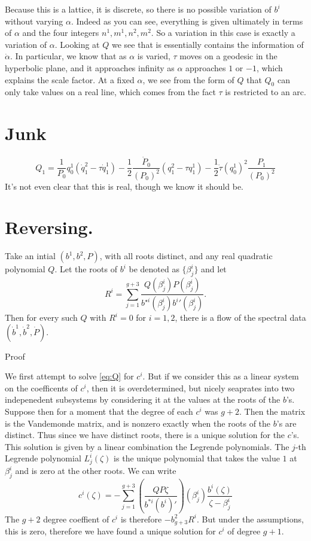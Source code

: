 \documentclass{article}
\begin{document}
Because this is a lattice, it is discrete, so there is no possible variation of $b^i$ without varying $\alpha$. Indeed as you can see, everything is given ultimately in terms of $\alpha$ and the four integers $n^1,m^1,n^2,m^2$. So a variation in this case is exactly a variation of $\alpha$. Looking at $Q$ we see that is essentially contains the information of $\dot\alpha$. In particular, we know that as $\alpha$ is varied, $\tau$ moves on a geodesic in the hyperbolic plane, and it approaches infinity as $\alpha$ approaches $1$ or $-1$, which explains the scale factor. At a fixed $\alpha$, we see from the form of $Q$ that $Q_0$ can only take values on a real line, which comes from the fact $\tau$ is restricted to an arc.

\chapter{Junk} %
\label{chp:junk}
\[
Q_1 = \frac{1}{P_0}q^1_0(\dot q^2_1 - \tau \dot q^1_1)
-\frac{1}{2}\frac{\dot P_0}{(P_0)^2}(q^2_1 - \tau q^1_1)
-\frac{1}{2}\dot\tau(q^1_0)^2\frac{P_1}{(P_0)^2}
\]
It's not even clear that this is real, though we know it should be.

\chapter{Reversing.}
Take an intial $(b^1,b^2,P)$, with all roots distinct, and any real quadratic polynomial $Q$. Let the roots of $b^i$ be denoted as $\{\beta^i_j\}$ and let
\[
R^i = \sum_{j=1}^{g+3} \frac{Q(\beta^i_j) P(\beta^i_j)}{b^{\star i}(\beta^i_j) {b^i}'(\beta^i_j)}.
\]
Then for every such $Q$ with $R^i = 0$ for $i=1,2$, there is a flow of the spectral data $(\dot b^1, \dot b^2, \dot P)$.

Proof

We first attempt to solve \eqref{eq:Q} for $c^i$. But if we consider this as a linear system on the coefficents of $c^i$, then it is overdetermined, but nicely seaprates into two indepenedent subsystems by considering it at the values at the roots of the $b$'s. Suppose then for a moment that the degree of each $c^i$ was $g+2$. Then the matrix is the Vandemonde matrix, and is nonzero exactly when the roots of the $b$'s are distinct. Thus since we have distinct roots, there is a unique solution for the $c$'s. This solution is given by a linear combination the Legrende polynomials. The $j$-th Legrende polynomial $L^i_j(\zeta)$ is the unique polynomial that takes the value $1$ at $\beta^i_j$ and is zero at the other roots. We can write
\[
c^i(\zeta) = - \sum_{j=1}^{g+3} \left( \frac{QP\zeta}{b^{*i}(b^i)'}\right)(\beta^i_j) \frac{b^i(\zeta)}{\zeta-\beta^i_j}
\]
The $g+2$ degree coeffient of $c^i$ is therefore $-b^2_{g+3}R^i$. But under the assumptions, this is zero, therefore we have found a unique solution for $c^i$ of degree $g+1$.
\end{document}
